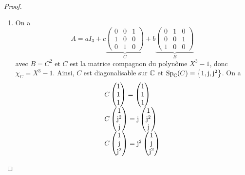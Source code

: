 \documentclass[12pt]{article}
\begin{document}
\begin{proof}
	\phantom{}
	\begin{enumerate}
		\item On a 
		\begin{equation}
			A=aI_{3}+c\underbrace{\begin{pmatrix}
				0&0&1\\1&0&0\\0&1&0
			\end{pmatrix}}_{C}+b\underbrace{\begin{pmatrix}
				0&1&0\\0&0&1\\1&0&0
			\end{pmatrix}}_{B}
		\end{equation}
		avec $B=C^{2}$ et $C$ est la matrice compagnon du polynôme $X^{3}-1$, donc $\chi_{C}=X^{3}-1$. Ainsi, $C$ est diagonalisable sur $\mathbb{C}$ et $\operatorname{Sp}_{\mathbb{C}}(C)=\left\lbrace1,\mathrm{j},\mathrm{j}^{2}\right\rbrace$. On a 
		\begin{equation}
			\begin{array}[]{l}
				C\begin{pmatrix}
					1\\1\\1
				\end{pmatrix}=\begin{pmatrix}
					1\\1\\1
				\end{pmatrix}\\
				C\begin{pmatrix}
					1\\\j^{2}\\\j
				\end{pmatrix}=\j\begin{pmatrix}
					1\\\j^{2}\\\j
				\end{pmatrix}\\
				C\begin{pmatrix}
					1\\\j\\\j^{2}
				\end{pmatrix}=\j^{2}\begin{pmatrix}
					1\\\j\\\j^{2}
				\end{pmatrix}\\
			\end{array}
		\end{equation}

\end{enumerate}
\end{proof}
\end{document}
